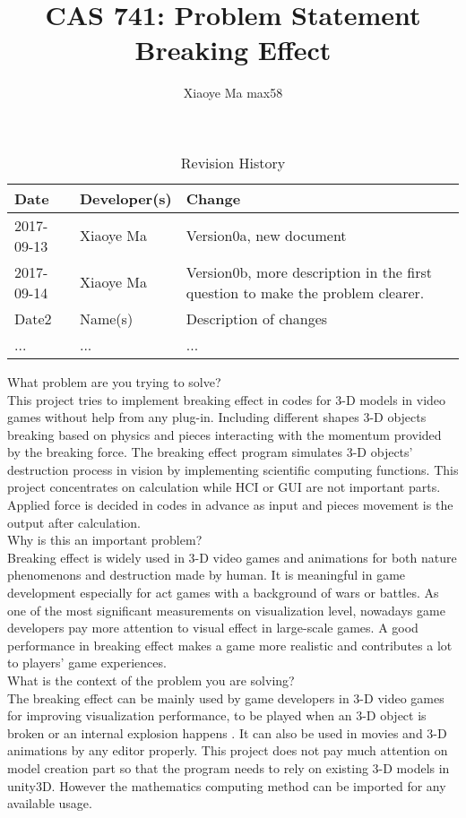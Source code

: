 \documentclass{article}
\title{CAS 741: Problem Statement\\Breaking Effect}
\author{Xiaoye Ma max58}
\date{}
\begin{document}
\maketitle

\begin{table}[hp]
\caption{Revision History} \label{TblRevisionHistory}
\begin{tabularx}{\textwidth}{llX}
\toprule
\textbf{Date} & \textbf{Developer(s)} & \textbf{Change}\\
\midrule
2017-09-13 & Xiaoye Ma & Version0a, new document\\
2017-09-14 & Xiaoye Ma & Version0b, more description in the first question to make the problem clearer.\\
Date2 & Name(s) & Description of changes\\
... & ... & ...\\
\bottomrule
\end{tabularx}
\end{table}

What problem are you trying to solve?\\

This project tries to implement breaking effect in codes for 3-D models in video games without help from any plug-in. Including different shapes 3-D objects breaking based on physics and pieces interacting with the momentum provided by the breaking force. The breaking effect program simulates 3-D objects’ destruction process in vision by implementing scientific computing functions. This project concentrates on calculation while HCI or GUI are not important parts. Applied force is decided in codes in advance as input and pieces movement is the output after calculation.\\      

Why is this an important problem?\\

Breaking effect is widely used in 3-D video games and animations for both nature phenomenons and destruction made by human. It is meaningful in game development especially for act games with a background of wars or battles. As one of the most significant measurements on visualization level, nowadays game developers pay more attention to visual effect in large-scale games. A good performance in breaking effect makes a game more realistic and contributes a lot to players’ game experiences.\\ 

What is the context of the problem you are solving?\\

The breaking effect can be mainly used by game developers in 3-D video games for improving visualization performance, to be played when an 3-D object is broken or an internal explosion happens . It can also be used in movies and 3-D animations by any editor properly. This project does not pay much attention on model creation part so that the program needs to rely on existing 3-D models in unity3D. However the mathematics computing method can be imported for any available usage. \\
\end{document}
